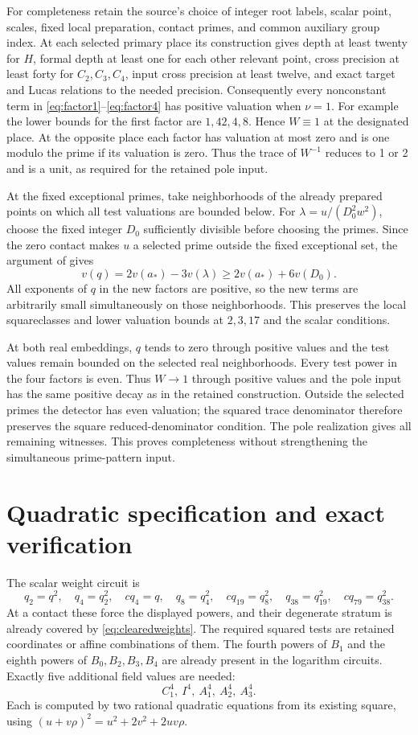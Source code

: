 \documentclass[11pt,a4paper]{article}
\theoremstyle{remark}\newtheorem{remark}[theorem]{Remark}
\begin{document}
For completeness retain the source's choice of integer root labels,
scalar point, scales, fixed local preparation, contact primes, and
common auxiliary group index. At each selected primary place its
construction gives depth at least twenty for $H$, formal depth at
least one for each other relevant point, cross precision at least
forty for $C_2,C_3,C_4$, input cross precision at least twelve,
and exact target and Lucas relations to the needed precision.
Consequently every nonconstant term in
\eqref{eq:factor1}--\eqref{eq:factor4} has positive valuation when
$\nu=1$. For example the lower bounds for the first factor are
$1,42,4,8$. Hence $W\equiv1$ at the designated place. At the opposite
place each factor has valuation at most zero and is one modulo the
prime if its valuation is zero. Thus the trace of $W^{-1}$ reduces
to 1 or 2 and is a unit, as required for the retained pole input.

At the fixed exceptional primes, take neighborhoods of the already
prepared points on which all test valuations are bounded below.
For $\lambda=u/(D_0^2w^2)$, choose the fixed integer $D_0$ sufficiently
divisible before choosing the primes. Since the zero contact makes
$u$ a selected prime outside the fixed exceptional set, the argument
of \cite[Section 3]{Shared} gives
\[
        v(q)=2v(a_*)-3v(\lambda)
                \ge2v(a_*)+6v(D_0).
\]
All exponents of $q$ in the new factors are positive, so the new
terms are arbitrarily small simultaneously on those neighborhoods.
This preserves the local squareclasses and lower valuation bounds
at $2,3,17$ and the scalar conditions.

At both real embeddings, $q$ tends to zero through positive values
and the test values remain bounded on the selected real neighborhoods.
Every test power in the four factors is even. Thus $W\to1$ through
positive values and the pole input has the same positive decay as in
the retained construction. Outside the selected primes the detector
has even valuation; the squared trace denominator therefore preserves
the square reduced-denominator condition. The pole realization gives
all remaining witnesses. This proves completeness without strengthening
the simultaneous prime-pattern input.

\section{Quadratic specification and exact verification}
The scalar weight circuit is
\[
 q_2=q^2,\quad q_4=q_2^2,\quad c q_4=q,\quad q_8=q_4^2,
 \quad c q_{19}=q_8^2,\quad q_{38}=q_{19}^2,
 \quad c q_{79}=q_{38}^2.
\]
At a contact these force the displayed powers, and their degenerate
stratum is already covered by \eqref{eq:clearedweights}.
The required squared tests are retained coordinates or affine
combinations of them. The fourth powers of $B_1$ and the eighth
powers of $B_0,B_2,B_3,B_4$ are already present in the logarithm
circuits. Exactly five additional field values are needed:
\[
                  C_1^4,\ I^4,\ A_1^4,\ A_2^4,\ A_3^4.
\]
Each is computed by two rational quadratic equations from its existing
square, using $(u+v\rho)^2=u^2+2v^2+2uv\rho$.
\end{document}

